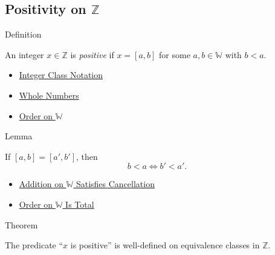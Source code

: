 \subsection*{\texorpdfstring{Positivity on $\mathbb{Z}$}{Positivity on Z}}

\begin{definitionbox}{Definition}
\begin{definition}
\label{def:positive-integer}
An integer $x\in\mathbb{Z}$ is \emph{positive} if $x=[a,b]$ for some
$a,b\in\mathbb{W}$ with $b<a$.
\end{definition}
\end{definitionbox}

\begin{dependencies}
\begin{itemize}
  \item \hyperref[def:integer-class-notation]{Integer Class Notation}
  \item \hyperref[def:whole-numbers]{Whole Numbers}
  \item \hyperref[def:order-on-w]{Order on $\mathbb{W}$}
\end{itemize}
\end{dependencies}

\begin{lemmabox}{Lemma}
\begin{lemma}
\label{lem:positivity-respects-equivalence}
If $[a,b]=[a',b']$, then
\[
b<a \Longleftrightarrow b'<a'.
\]
\end{lemma}
\end{lemmabox}

\begin{dependencies}
\begin{itemize}
  \item \hyperref[thm:addition-on-w-cancellation]{Addition on $\mathbb{W}$ Satisfies Cancellation}
  \item \hyperref[thm:order-on-w-total]{Order on $\mathbb{W}$ Is Total}
\end{itemize}
\end{dependencies}

\begin{theorembox}{Theorem}
\begin{theorem}
\label{thm:positivity-on-z-well-defined}
The predicate ``$x$ is positive'' is well-defined on equivalence classes in
$\mathbb{Z}$.
\end{theorem}
\end{theorembox}

